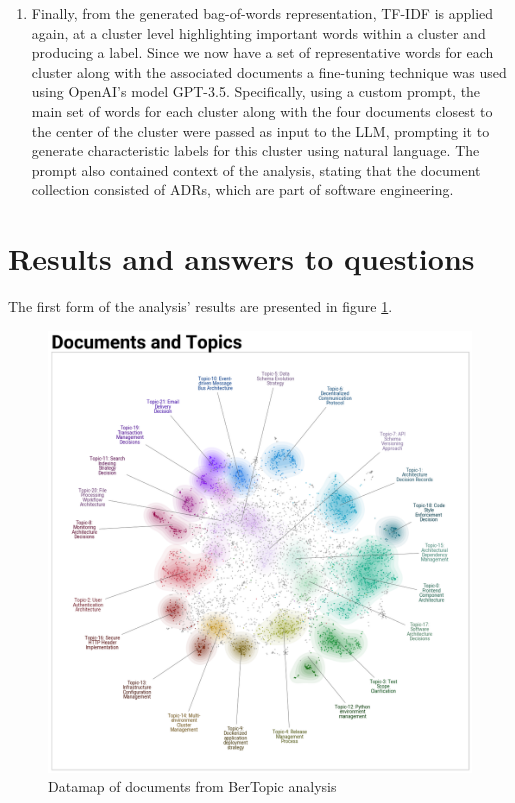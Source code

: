 \begin{enumerate}
            \item Finally, from the generated bag-of-words representation, TF-IDF is applied again, at a cluster level highlighting important words within a cluster and producing a label. Since we now have a set of representative words for each cluster along with the associated documents a fine-tuning technique was used using OpenAI's model GPT-3.5. Specifically, using a custom prompt, the main set of words for each cluster along with the four documents closest to the center of the cluster were passed as input to the LLM, prompting it to generate characteristic labels for this cluster using natural language. The prompt also contained context of the analysis, stating that the document collection consisted of ADRs, which are part of software engineering.
            
        \end{enumerate}
        
        
    \section{Results and answers to questions}
        The first form of the analysis' results are presented in figure \ref{fig:bertopic_datamap_original}.

        \begin{figure}[h]
            \centering
            \includegraphics[scale=0.5]{figures/BerTopic_Original/datamap_original.png}
            \caption{Datamap of documents from BerTopic analysis}
            \label{fig:bertopic_datamap_original}
        \end{figure}
        
